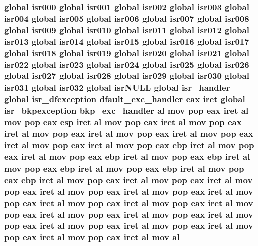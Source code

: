 \subsubsection[{\texorpdfstring{al}{al}}]{\setlength{\rightskip}{0pt plus 5cm}global {\bf isr000} global {\bf isr001} global {\bf isr002} global {\bf isr003} global {\bf isr004} global {\bf isr005} global {\bf isr006} global {\bf isr007} global {\bf isr008} global {\bf isr009} global {\bf isr010} global {\bf isr011} global {\bf isr012} global {\bf isr013} global {\bf isr014} global {\bf isr015} global {\bf isr016} global {\bf isr017} global {\bf isr018} global {\bf isr019} global {\bf isr020} global {\bf isr021} global {\bf isr022} global {\bf isr023} global {\bf isr024} global {\bf isr025} global {\bf isr026} global {\bf isr027} global {\bf isr028} global {\bf isr029} global {\bf isr030} global {\bf isr031} global isr032 global isr\+N\+U\+LL global isr\+\_\+handler global {\bf isr\+\_\+dfexception} {\bf dfault\+\_\+exc\+\_\+handler} eax iret global {\bf isr\+\_\+bkpexception} {\bf bkp\+\_\+exc\+\_\+handler} al {\bf mov} pop eax iret al {\bf mov} pop eax esp iret al {\bf mov} pop eax iret al {\bf mov} pop eax iret al {\bf mov} pop eax iret al {\bf mov} pop eax iret al {\bf mov} pop eax iret al {\bf mov} pop eax iret al {\bf mov} pop eax ebp iret al {\bf mov} pop eax iret al {\bf mov} pop eax ebp iret al {\bf mov} pop eax ebp iret al {\bf mov} pop eax ebp iret al {\bf mov} pop eax ebp iret al {\bf mov} pop eax ebp iret al {\bf mov} pop eax iret al {\bf mov} pop eax iret al {\bf mov} pop eax iret al {\bf mov} pop eax iret al {\bf mov} pop eax iret al {\bf mov} pop eax iret al {\bf mov} pop eax iret al {\bf mov} pop eax iret al {\bf mov} pop eax iret al {\bf mov} pop eax iret al {\bf mov} pop eax iret al {\bf mov} pop eax iret al {\bf mov} pop eax iret al {\bf mov} pop eax iret al {\bf mov} pop eax iret al {\bf mov} pop eax iret al {\bf mov} al}\hypertarget{isrs_8as_a55801884e6527c2d735351b4d6b66caf}{}\label{isrs_8as_a55801884e6527c2d735351b4d6b66caf}
